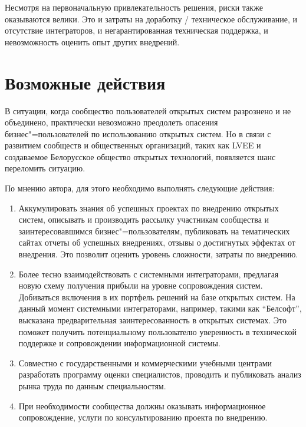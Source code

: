 \documentclass[10pt, a5paper]{article}
\begin{document}
Несмотря на первоначальную привлекательность решения, риски также оказываются велики. Это и затраты на доработку / техническое обслуживание, и отсутствие интеграторов, и негарантированная техническая поддержка, и невозможность оценить опыт других внедрений.

\section*{Возможные действия}

В ситуации, когда сообщество пользователей открытых систем разрознено и не объединено, практически невозможно преодолеть опасения бизнес"=пользователей по использованию открытых систем.
Но в связи с развитием сообществ и общественных организаций, таких как LVEE и создаваемое Белорусское общество открытых технологий, появляется шанс переломить ситуацию.

По мнению автора, для этого необходимо выполнять следующие действия:

\begin{enumerate}
  \item Аккумулировать знания об успешных проектах по внедрению открытых систем, описывать и производить рассылку участникам сообщества и заинтересовавшимся бизнес"=пользователям, публиковать на тематических сайтах отчеты об успешных внедрениях, отзывы о достигнутых эффектах от внедрения. Это позволит оценить уровень сложности, затраты по внедрению.
  \item Более тесно взаимодействовать с системными интеграторами, предлагая новую схему получения прибыли на уровне сопровождения систем. Добиваться включения в их портфель решений на базе открытых систем. На данный момент системными интеграторами, например, такими как ``Белсофт'', высказана предварительная заинтересованность в открытых системах. Это поможет получить потенциальному пользователю уверенность в технической поддержке и сопровождении информационной системы.
  \item Совместно с государственными и коммерческими учебными центрами разработать программу оценки специалистов, проводить и публиковать анализ рынка труда по данным специальностям.
  \item При необходимости сообщества должны оказывать информационное сопровождение, услуги по консультированию проекта по внедрению.
\end{enumerate}
\end{document}
